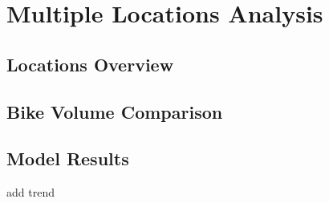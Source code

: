 \documentclass [11pt, proquest] {uwthesis}[2015/03/03]
\begin{document}
\newpage
\thispagestyle{empty}
\mbox{}



\chapter{Multiple Locations Analysis}

\section{Locations Overview}

\section{Bike Volume Comparison}

\section{Model Results}
add trend
\end{document}
